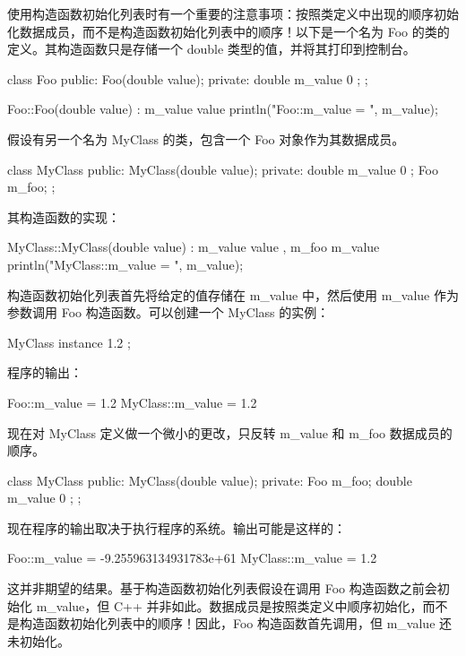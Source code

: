 使用构造函数初始化列表时有一个重要的注意事项：按照类定义中出现的顺序初始化数据成员，而不是构造函数初始化列表中的顺序！以下是一个名为 Foo 的类的定义。其构造函数只是存储一个 double 类型的值，并将其打印到控制台。

\begin{cpp}
class Foo
{
    public:
        Foo(double value);
    private:
        double m_value { 0 };
};

Foo::Foo(double value) : m_value { value }
{
    println("Foo::m_value = {}", m_value);
}
\end{cpp}

假设有另一个名为 MyClass 的类，包含一个 Foo 对象作为其数据成员。

\begin{cpp}
class MyClass
{
    public:
        MyClass(double value);
    private:
        double m_value { 0 };
        Foo m_foo;
};
\end{cpp}

其构造函数的实现：

\begin{cpp}
MyClass::MyClass(double value) : m_value { value }, m_foo { m_value }
{
    println("MyClass::m_value = {}", m_value);
}
\end{cpp}

构造函数初始化列表首先将给定的值存储在 m\_value 中，然后使用 m\_value 作为参数调用 Foo 构造函数。可以创建一个 MyClass 的实例：

\begin{cpp}
MyClass instance { 1.2 };
\end{cpp}

程序的输出：

\begin{cpp}
Foo::m_value = 1.2
MyClass::m_value = 1.2
\end{cpp}

现在对 MyClass 定义做一个微小的更改，只反转 m\_value 和 m\_foo 数据成员的顺序。

\begin{cpp}
class MyClass
{
    public:
        MyClass(double value);
    private:
        Foo m_foo;
        double m_value { 0 };
};
\end{cpp}

现在程序的输出取决于执行程序的系统。输出可能是这样的：

\begin{shell}
Foo::m_value = -9.255963134931783e+61
MyClass::m_value = 1.2
\end{shell}

这并非期望的结果。基于构造函数初始化列表假设在调用 Foo 构造函数之前会初始化 m\_value，但 C++ 并非如此。数据成员是按照类定义中顺序初始化，而不是构造函数初始化列表中的顺序！因此，Foo 构造函数首先调用，但 m\_value 还未初始化。

